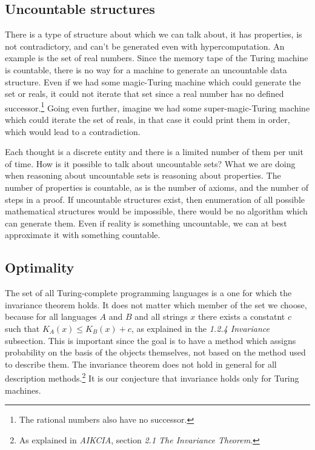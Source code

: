 \newpage

\subsection{Uncountable structures}

There is a type of structure about which we can talk about, it has properties, is not contradictory, and can't be generated even with hypercomputation.
An example is the set of real numbers. 
Since the memory tape of the Turing machine is countable, there is no way for a machine to generate an uncountable data structure.
Even if we had some magic-Turing machine which could generate the set or reals, it could not iterate that set since a real number has no defined successor.\footnote{The rational numbers also have no successor.}
Going even further, imagine we had some super-magic-Turing machine which could iterate the set of reals, in that case it could print them in order, which would lead to a contradiction.

Each thought is a discrete entity and there is a limited number of them per unit of time.
How is it possible to talk about uncountable sets?
What we are doing when reasoning about uncountable sets is reasoning about properties.
The number of properties is countable, as is the number of axioms, and the number of steps in a proof.
If uncountable structures exist, then enumeration of all possible mathematical structures would be impossible, there would be no algorithm which can generate them.
Even if reality is something uncountable, we can at best approximate it with something countable.

\newpage

\subsection{Optimality}

The set of all Turing-complete programming languages is a one for which the invariance theorem holds.
It does not matter which member of the set we choose, because for all languages $A$ and $B$ and all strings $x$ there exists a constatnt $c$ such that $K_A(x) \leq K_B(x) + c$, as explained in the \textit{1.2.4 Invariance} subsection.
This is important since the goal is to have a method which assigns probability on the basis of the objects themselves, not based on the method used to describe them.
The invariance theorem does not hold in general for all description methods.\footnote{As explained in \textit{AIKCIA}, section \textit{2.1 The Invariance Theorem}.}
It is our conjecture that invariance holds only for Turing machines.

